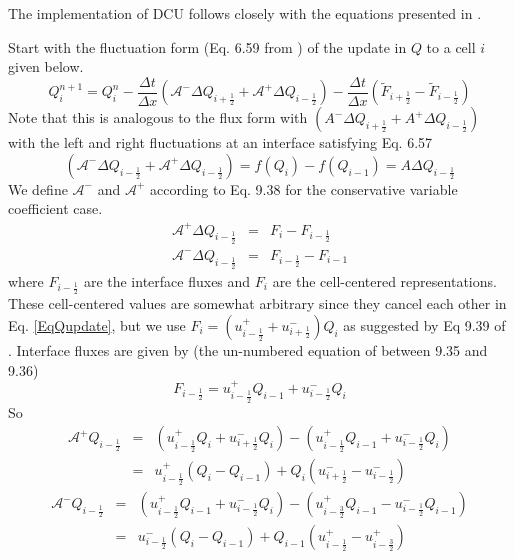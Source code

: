 The implementation of DCU follows closely with the equations presented in
\cite{LeVeque03}.

Start with the fluctuation form (Eq. 6.59 from \cite{LeVeque03}) of the update in $Q$ to
a cell $i$ given below.
\begin{equation}\label{EqQupdate}
Q^{n+1}_i = Q^{n}_i - \frac{\Delta t}{\Delta x} 
\left( \mathcal{A}^{-} \Delta Q_{i+\frac{1}{2}} + \mathcal{A}^{+} \Delta Q_{i-\frac{1}{2}}\right) -
\frac{\Delta t}{\Delta x}
\left( \widetilde{F}_{i+\frac{1}{2}} - \widetilde{F}_{i-\frac{1}{2}}\right)
\end{equation}
Note that this is analogous to the flux form with
$(A^{-}\Delta Q_{i+\frac{1}{2}} + A^{+}\Delta Q_{i-\frac{1}{2}})$ with the left and
right fluctuations at an interface satisfying Eq. 6.57 
\begin{equation}\label{Eqflucdef}
(\mathcal{A}^{-}\Delta Q_{i-\frac{1}{2}} + \mathcal{A}^{+}\Delta Q_{i-\frac{1}{2}})=
f(Q_i)-f(Q_{i-1})= A \Delta Q_{i-\frac{1}{2}}
\end{equation}
We define $\mathcal{A}^{-}$ and $\mathcal{A}^{+}$ according to Eq. 9.38 for the
conservative variable coefficient case.
\begin{eqnarray}
\mathcal{A}^{+} \Delta Q_{i-\frac{1}{2}} &=& F_i - F_{i-\frac{1}{2}} \\
\mathcal{A}^{-} \Delta Q_{i-\frac{1}{2}} &=& F_{i-\frac{1}{2}} - F_{i-1}
\end{eqnarray}
where $F_{i-\frac{1}{2}}$ are the interface fluxes and $F_i$ are the cell-centered
representations.  These cell-centered values are somewhat arbitrary since they cancel
each other in Eq. \ref{EqQupdate}, but we use
$F_i = (u^{+}_{i-\frac{1}{2}} + u^{-}_{i+\frac{1}{2}})Q_i$ as suggested by
Eq 9.39 of \cite{LeVeque03}.  Interface fluxes are given by (the un-numbered
equation of \cite{LeVeque03} between 9.35 and 9.36)
\begin{equation}\label{Eqfluxdef}
F_{i-\frac{1}{2}} = u^{+}_{i-\frac{1}{2}} Q_{i-1} + u^{-}_{i-\frac{1}{2}} Q_{i}
\end{equation}
So
\begin{eqnarray}
\mathcal{A}^{+} Q_{i-\frac{1}{2}} &=&  
  \left( u^{+}_{i-\frac{1}{2}} Q_{i}   + u^{-}_{i+\frac{1}{2}} Q_{i} \right) -
  \left( u^{+}_{i-\frac{1}{2}} Q_{i-1} + u^{-}_{i-\frac{1}{2}} Q_{i} \right) \\
                                  &=& 
 u^{+}_{i-\frac{1}{2}} \left( Q_{i} - Q_{i-1} \right) +
                 Q_{i} \left( u^{-}_{i+\frac{1}{2}} - u^{-}_{i-\frac{1}{2}}  \right)
\end{eqnarray}
\begin{eqnarray}
\mathcal{A}^{-} Q_{i-\frac{1}{2}} &=&  
  \left( u^{+}_{i-\frac{1}{2}} Q_{i-1} + u^{-}_{i-\frac{1}{2}} Q_{i}   \right) -
  \left( u^{+}_{i-\frac{3}{2}} Q_{i-1} - u^{-}_{i-\frac{1}{2}} Q_{i-1} \right) \\
                                  &=& 
  u^{-}_{i-\frac{1}{2}} \left( Q_{i} - Q_{i-1} \right) +
                Q_{i-1} \left( u^{+}_{i-\frac{1}{2}} - u^{+}_{i-\frac{3}{2}}  \right)
\end{eqnarray}

